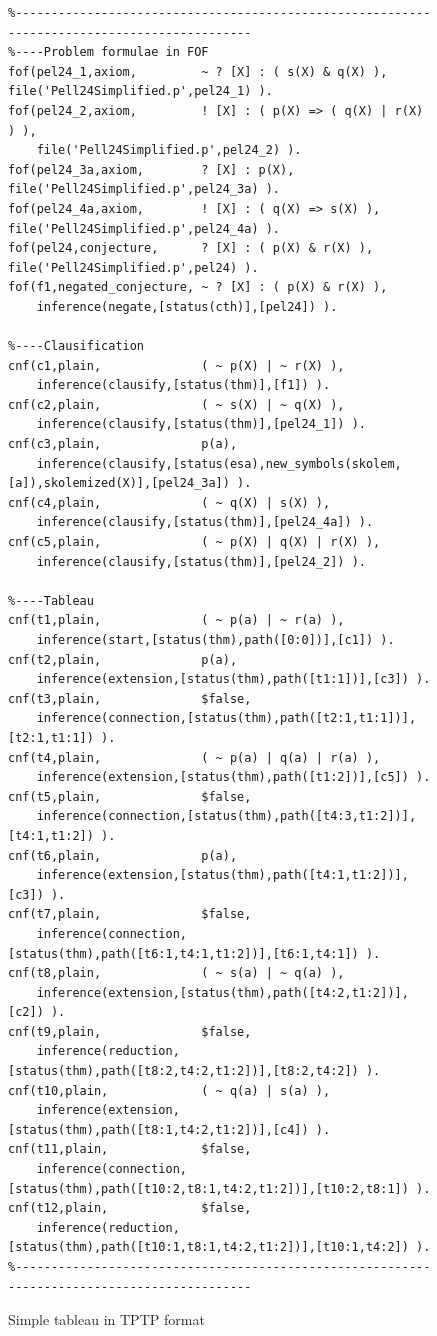 \documentclass[runningheads]{llncs}
\begin{document}
\begin{figure}[htb]
\centering
{\scriptsize
{\setlength{\baselineskip}{3mm}
\begin{verbatim}
%--------------------------------------------------------------------------------------------
%----Problem formulae in FOF
fof(pel24_1,axiom,         ~ ? [X] : ( s(X) & q(X) ),  file('Pell24Simplified.p',pel24_1) ).
fof(pel24_2,axiom,         ! [X] : ( p(X) => ( q(X) | r(X) ) ),
    file('Pell24Simplified.p',pel24_2) ).
fof(pel24_3a,axiom,        ? [X] : p(X),               file('Pell24Simplified.p',pel24_3a) ).
fof(pel24_4a,axiom,        ! [X] : ( q(X) => s(X) ),   file('Pell24Simplified.p',pel24_4a) ).
fof(pel24,conjecture,      ? [X] : ( p(X) & r(X) ),    file('Pell24Simplified.p',pel24) ).
fof(f1,negated_conjecture, ~ ? [X] : ( p(X) & r(X) ),
    inference(negate,[status(cth)],[pel24]) ).

%----Clausification
cnf(c1,plain,              ( ~ p(X) | ~ r(X) ),
    inference(clausify,[status(thm)],[f1]) ).
cnf(c2,plain,              ( ~ s(X) | ~ q(X) ),
    inference(clausify,[status(thm)],[pel24_1]) ).
cnf(c3,plain,              p(a),
    inference(clausify,[status(esa),new_symbols(skolem,[a]),skolemized(X)],[pel24_3a]) ).
cnf(c4,plain,              ( ~ q(X) | s(X) ),
    inference(clausify,[status(thm)],[pel24_4a]) ).
cnf(c5,plain,              ( ~ p(X) | q(X) | r(X) ),
    inference(clausify,[status(thm)],[pel24_2]) ).

%----Tableau
cnf(t1,plain,              ( ~ p(a) | ~ r(a) ),
    inference(start,[status(thm),path([0:0])],[c1]) ).
cnf(t2,plain,              p(a),
    inference(extension,[status(thm),path([t1:1])],[c3]) ).
cnf(t3,plain,              $false,
    inference(connection,[status(thm),path([t2:1,t1:1])],[t2:1,t1:1]) ).
cnf(t4,plain,              ( ~ p(a) | q(a) | r(a) ),
    inference(extension,[status(thm),path([t1:2])],[c5]) ).
cnf(t5,plain,              $false,
    inference(connection,[status(thm),path([t4:3,t1:2])],[t4:1,t1:2]) ).
cnf(t6,plain,              p(a),
    inference(extension,[status(thm),path([t4:1,t1:2])],[c3]) ).
cnf(t7,plain,              $false,
    inference(connection,[status(thm),path([t6:1,t4:1,t1:2])],[t6:1,t4:1]) ).
cnf(t8,plain,              ( ~ s(a) | ~ q(a) ),
    inference(extension,[status(thm),path([t4:2,t1:2])],[c2]) ).
cnf(t9,plain,              $false,
    inference(reduction,[status(thm),path([t8:2,t4:2,t1:2])],[t8:2,t4:2]) ).
cnf(t10,plain,             ( ~ q(a) | s(a) ),
    inference(extension,[status(thm),path([t8:1,t4:2,t1:2])],[c4]) ).
cnf(t11,plain,             $false,
    inference(connection,[status(thm),path([t10:2,t8:1,t4:2,t1:2])],[t10:2,t8:1]) ).
cnf(t12,plain,             $false,
    inference(reduction,[status(thm),path([t10:1,t8:1,t4:2,t1:2])],[t10:1,t4:2]) ).
%--------------------------------------------------------------------------------------------
\end{verbatim}
}}
\caption{Simple tableau in TPTP format}
\label{SimpleTableauCode}
\end{figure}
\end{document}
